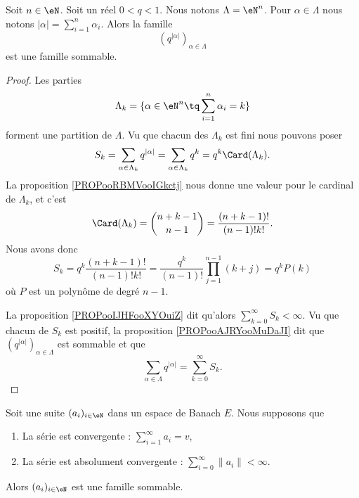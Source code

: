 \begin{proposition}	\label{PROPooIJHFooXYOuiZ}
	Soit \( n\in \eN\). Soit un réel \( 0<q<1\). Nous notons \( \Lambda=\eN^n\). Pour \( \alpha\in \Lambda\) nous notons \( | \alpha |=\sum_{i=1}^n\alpha_i\). Alors la famille
	\begin{equation}
		(q^{| \alpha |})_{\alpha\in \Lambda}
	\end{equation}
	est une famille sommable.
\end{proposition}

\begin{proof}
	Les parties
	\begin{equation}
		\Lambda_k=\{ \alpha\in \eN^n\tq \sum_{i=1}^n\alpha_i=k \}
	\end{equation}
	forment une partition de \( \Lambda\). Vu que chacun des \( \Lambda_k\) est fini nous pouvons poser
	\begin{equation}
		S_k=\sum_{\alpha\in \Lambda_k}q^{| \alpha |}=\sum_{\alpha\in \Lambda_k}q^k=q^k\Card(\Lambda_k).
	\end{equation}
	La proposition \ref{PROPooRBMVooIGkctj} nous donne une valeur pour le cardinal de \( \Lambda_k\), et c'est
	\begin{equation}
		\Card(\Lambda_k)=\binom{ n+k-1 }{ n-1 }=\frac{ (n+k-1)! }{ (n-1)!k! }.
	\end{equation}
	Nous avons donc
	\begin{equation}
		S_k=q^k\frac{ (n+k-1)! }{ (n-1)!k! }=\frac{ q^k }{ (n-1)! }\prod_{j=1}^{n-1}(k+j)=q^kP(k)
	\end{equation}
	où \( P\) est un polynôme de degré \( n-1\).

	La proposition \ref{PROPooIJHFooXYOuiZ} dit qu'alors \( \sum_{k=0}^{\infty}S_k<\infty\). Vu que chacun de \( S_k\) est positif, la proposition \ref{PROPooAJRYooMuDaJI} dit que \( (q^{| \alpha |})_{\alpha\in\Lambda}\) est sommable et que
	\begin{equation}
		\sum_{\alpha\in\Lambda}q^{| \alpha |}=\sum_{k=0}^{\infty}S_k.
	\end{equation}
\end{proof}

\begin{proposition}	\label{PROPooHCLZooLjQNDl}
	Soit une suite \( (a_i)_{i\in \eN}\) dans un espace de Banach \( E\). Nous supposons que
	\begin{enumerate}
		\item
		      La série est convergente : \( \sum_{i=1}^{\infty}a_i=v\),
		\item
		      La série est absolument convergente : \( \sum_{i=0}^{\infty}\| a_i \|<\infty\).
	\end{enumerate}
	Alors \( (a_i)_{i\in \eN}\) est une famille sommable.
\end{proposition}


